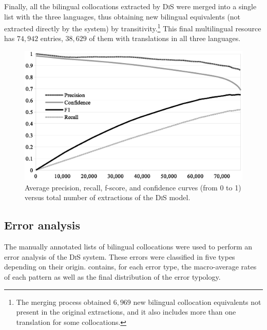 \documentclass[output=paper
,modfonts
,nonflat]{langsci/langscibook}
\begin{document}
Finally, all the bilingual collocations extracted by \textsc{DiS} were merged
into a single list with the three languages, thus obtaining new bilingual
equivalents (not extracted directly by the system) by transitivity.\footnote{The merging process
  obtained $6,969$ new bilingual collocation equivalents not present in the original extractions, and it also
  includes more than one translation for some collocations.}
This final multilingual resource has $74,942$ entries, $38,629$ of them with translations in all three languages.

\begin{figure}
  \centering
  \includegraphics[width=\textwidth]{figures/curve.eps}
  \caption{\label{fig:curva}Average precision, recall, f-score, and confidence
    curves (from 0 to 1) versus total number of extractions of the \textsc{DiS} model.}
\end{figure}

%
\subsection{Error analysis}
\label{garcia:sec:error}
The manually annotated lists of bilingual collocations were used to perform an error analysis
of the \textsc{DiS} system. These errors were classified in five types depending on
their origin.  contains, for each error type, the macro-average rates
of each  pattern as well as the final distribution of the error typology.
\end{document}
